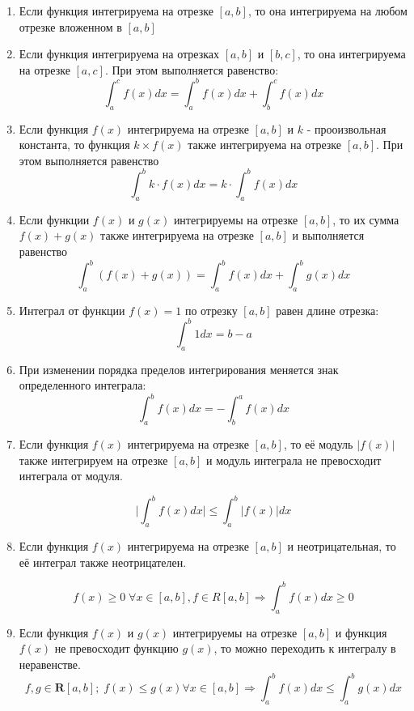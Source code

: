 \documentclass[a4paper,12pt]{article}
\theoremstyle{plain} %
\theoremstyle{definition} %
\theoremstyle{remark} %
\begin{document}
\begin{enumerate}
	\item Если функция интегрируема на отрезке $[a, b]$, то она интегрируема на любом отрезке вложенном в $[a, b]$

	\item Если функция интегрируема на отрезках $[a, b]$ и $[b, c]$, то она интегрируема на отрезке $[a, c]$. При этом выполняется равенство:
	      \[
		      \int_a^c f(x) dx = \int_a^b f(x)dx + \int_b^c f(x) dx
	      \]

	\item Если функция $f(x)$ интегрируема на отрезке $[a, b]$ и $k$ - прооизвольная константа, то функция $k \times f(x)$ также интегрируема на отрезке $[a, b]$. При этом выполняется равенство \[ \int_a^b k \cdot f(x)dx = k \cdot \int_a^b f(x) dx \]

	\item Если функции $f(x)$ и $g(x)$ интегрируемы на отрезке $[a, b]$, то их сумма $f(x) + g(x)$ также интегрируема на отрезке $[a, b]$ и выполняется равенство \[ \int_a^b (f(x) + g(x)) = \int_a^b f(x)dx + \int_a^b g(x) dx \]

	\item Интеграл от функции $f(x) = 1$ по отрезку $[a, b]$ равен длине отрезка:
	      \[
		      \int_a^b 1 dx = b - a
	      \]

	\item При изменении порядка пределов интегрирования меняется знак определенного интеграла:
	      \[
		      \int_a^b f(x) dx = - \int_b^a f(x) dx
	      \]

	\item Если функция $f(x)$ интегрируема на отрезке $[a, b]$, то её модуль $|f(x)|$ также интегрируем на отрезке $[a, b]$ и модуль интеграла не превосходит интеграла от модуля.

	      \[
		      \Big| \int_a^b f(x) dx \Big| \leq \int_a^b \Big| f(x) \Big| dx
	      \]

	\item Если функция $f(x)$ интегрируема на отрезке $[a, b]$ и неотрицательная, то её интеграл также неотрицателен.

	      \[
		      f(x) \geq 0 \; \forall x \in [a, b], f \in R[a, b] \Rightarrow \int_a^b f(x)dx \geq 0
	      \]

	\item Если функция $f(x)$ и $g(x)$ интегрируемы на отрезке $[a, b]$ и функция $f(x)$ не превосходит функцию $g(x)$, то можно переходить к интегралу в неравенстве.
	      \[
		      f,g \in \mathbf{R}[a, b]; \; f(x) \leq g(x) \forall x \in [a,b] \Rightarrow \int_a^b f(x) dx \leq \int_a^b g(x) dx
	      \]


\end{enumerate}
\end{document}
